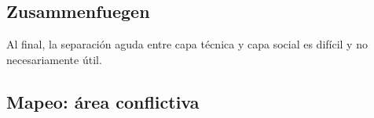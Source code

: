 \subsection{Zusammenfuegen}

Al final, la separación aguda entre capa técnica y capa social es difícil y no necesariamente útil.

\begin{comment}
> framing the Internet alternately as lawless, anarchic,
> free, “a world where anyone, anywhere may express his or her beliefs, no matter how singular,
> without fear of being coerced into silence or conformity” (Barlow 1996) (p.1)

* la infraestructura está prerequisito para participación

## Conclusión del texto [Rieder2012]

> If technology won’t deliver us from the conundrums of
> governance, negotiation, and struggle, we
> may as well reengage politics proper[ly].

* sobre todo problemas sociales/políticos: organización de grupos (no tanto técnicos): ¿cómo decidimos como grupo? ¿quién hace qué? ¿quién está responsable?
* soluciones políticas para problemas políticos
\end{comment}

\subsection{Mapeo: área conflictiva}

